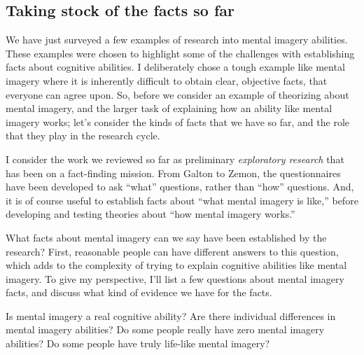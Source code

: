 \documentclass[
  oneside,
  12pt]{crumpbook}
\begin{document}
\hypertarget{taking-stock-of-the-facts-so-far}{%
\subsection{Taking stock of the facts so far}\label{taking-stock-of-the-facts-so-far}}

We have just surveyed a few examples of research into mental imagery abilities. These examples were chosen to highlight some of the challenges with establishing facts about cognitive abilities. I deliberately chose a tough example like mental imagery where it is inherently difficult to obtain clear, objective facts, that everyone can agree upon. So, before we consider an example of theorizing about mental imagery, and the larger task of explaining how an ability like mental imagery works; let's consider the kinds of facts that we have so far, and the role that they play in the research cycle.

I consider the work we reviewed so far as preliminary \emph{exploratory research} that has been on a fact-finding mission. From Galton to Zemon, the questionnaires have been developed to ask ``what'' questions, rather than ``how'' questions. And, it is of course useful to establish facts about ``what mental imagery is like,'' before developing and testing theories about ``how mental imagery works.''

What facts about mental imagery can we say have been established by the research? First, reasonable people can have different answers to this question, which adds to the complexity of trying to explain cognitive abilities like mental imagery. To give my perspective, I'll list a few questions about mental imagery facts, and discuss what kind of evidence we have for the facts.

Is mental imagery a real cognitive ability? Are there individual differences in mental imagery abilities? Do some people really have zero mental imagery abilities? Do some people have truly life-like mental imagery?
\end{document}
